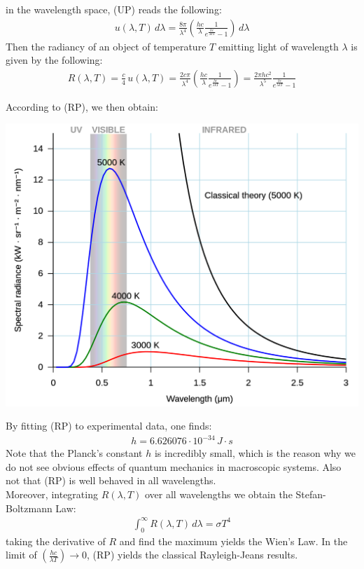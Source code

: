 \documentclass[11pt]{article}
\theoremstyle{break}
\theoremstyle{break}
\newcommand{\ee}[1]{\cdot 10^{#1}}
\begin{document}
in the wavelength space, (UP) reads the following:
\begin{align*}
u(\lambda, T) \, d\lambda = \frac{8\pi}{\lambda^4}\left( \frac{hc}{\lambda}\frac{1}{e^{\frac{hc}{\lambda kT}}-1}\right) \, d\lambda
\end{align*}
Then the radiancy of an object of temperature $T$ emitting light of wavelength $\lambda$ is given by the following:
\begin{align}
R(\lambda, T) = \frac{c}{4}\, u(\lambda, T) = \frac{2c \pi}{\lambda^4}\left( \frac{hc}{\lambda}\frac{1}{e^{\frac{hc}{\lambda kT}}-1}\right) = \frac{2\pi hc^2}{\lambda^5} \frac{1}{e^{\frac{hc}{\lambda kT}} - 1} \tag{RP}
\end{align}

According to (RP), we then obtain: \begin{center}
\includegraphics[scale=0.25]{Black_body.svg.png}
\end{center}

By fitting (RP) to experimental data, one finds:
\begin{align*}
h = 6.626076 \ee{-34}\, J\cdot s
\end{align*}
Note that the Planck's constant $h$ is incredibly small, which is the reason why we do not see obvious effects of quantum mechanics in macroscopic systems. Also not that (RP) is well behaved in all wavelengths.\\

Moreover, integrating $R(\lambda,T)$ over all wavelengths we obtain the Stefan-Boltzmann Law:
\begin{align*}
\int_0^{\infty} R(\lambda, T) \, d\lambda = \sigma T^4
\end{align*}
taking the derivative of $R$ and find the maximum yields the Wien's Law. In the limit of $(\frac{hc}{\lambda T})\to 0$, (RP) yields the classical Rayleigh-Jeans results. \\
\end{document}
